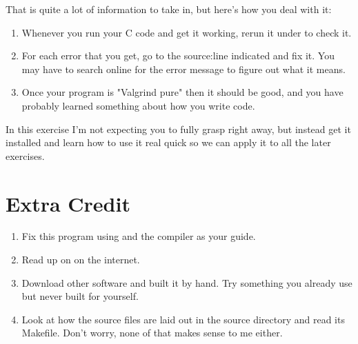 That is quite a lot of information to take in, but here's how you deal with it:

\begin{enumerate}
\item Whenever you run your C code and get it working, rerun it under 
    to check it.
\item For each error that you get, go to the source:line indicated and
    fix it.  You may have to search online for the error message to figure out
    what it means.
\item Once your program is "Valgrind pure" then it should be good, and you
    have probably learned something about how you write code.
\end{enumerate}

In this exercise I'm not expecting you to fully grasp  right
away, but instead get it installed and learn how to use it real quick so we
can apply it to all the later exercises.

\section{Extra Credit}

\begin{enumerate}
\item Fix this program using  and the compiler as your guide.
\item Read up on  on the internet.
\item Download other software and built it by hand. Try something you already
    use but never built for yourself.
\item Look at how the  source files are laid out in the
    source directory and read its Makefile.  Don't worry, none of that
    makes sense to me either.
\end{enumerate}

